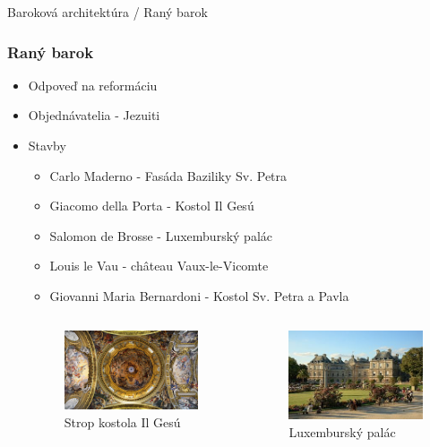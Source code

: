 \documentclass[dvipsnames]{beamer}
\begin{document}
\begin{frame}{\small \textcolor{g}{Baroková architektúra} / \Large Raný barok}
	\subsubsection{Raný barok}
	\begin{itemize}
		\item Odpoveď na reformáciu
		\item Objednávatelia - Jezuiti
		\item Stavby
		      \begin{itemize}
			      \item \textcolor{BurntOrange}{Carlo Maderno} - Fasáda Baziliky Sv. Petra
			      \item \textcolor{BurntOrange}{Giacomo della Porta} - Kostol Il Gesú
			      \item \textcolor{BurntOrange}{Salomon de Brosse} - Luxemburský palác
			      \item \textcolor{BurntOrange}{Louis le Vau} - château Vaux-le-Vicomte
			      \item \textcolor{BurntOrange}{Giovanni Maria Bernardoni} - Kostol Sv. Petra a Pavla
		      \end{itemize}
		      \begin{columns}
			      \kern0pt
			      \begin{figure}
				      \includegraphics[scale=0.5]{gesu}
				      \caption{Strop kostola Il Gesú}
			      \end{figure}%
			      \begin{figure}
				      \includegraphics[scale=3.5]{lux}
				      \caption{Luxemburský palác}
			      \end{figure}
		      \end{columns}
	\end{itemize}
\end{frame}
\end{document}
